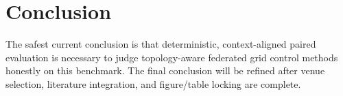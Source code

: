 \section{Conclusion}

The safest current conclusion is that deterministic, context-aligned paired evaluation is necessary to judge topology-aware federated grid control methods honestly on this benchmark. The final conclusion will be refined after venue selection, literature integration, and figure/table locking are complete.
